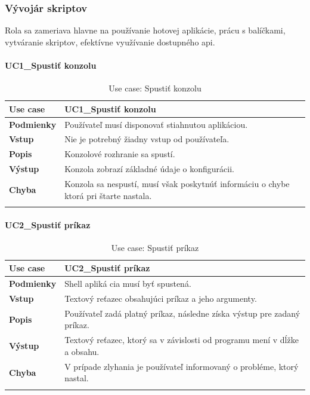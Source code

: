 {\subsubsection{Vývojár skriptov}
\indent Rola sa zameriava hlavne na používanie hotovej aplikácie, prácu s balíčkami, vytváranie skriptov, efektívne využívanie dostupného \acrshort{api}. 
\paragraph{UC1\_Spustiť konzolu}
\begin{center}
	\begin{longtable}{|p{2.5cm}|p{12.2cm}|}
		\hline
		\textbf{Use case} & UC1\_Spustiť konzolu \\ 
		\hline
		\textbf{Podmienky} & Používateľ musí disponovať stiahnutou aplikáciou.\\
		\hline
		\textbf{Vstup} & Nie je potrebný žiadny vstup od používateľa.\\
		\hline
		\textbf{Popis} & Konzolové rozhranie sa spustí. \\ 
		\hline
		\textbf{Výstup} & Konzola zobrazí základné údaje o konfigurácii.\\
		\hline
		\textbf{Chyba} & Konzola sa nespustí, musí však poskytnúť informáciu o chybe ktorá pri štarte nastala.\\
		\hline
	\caption{Use case: Spustiť konzolu}
	\label{table:1}
	\end{longtable}
\end{center}

\paragraph{UC2\_Spustiť príkaz}
\begin{center}
	\begin{longtable}{|p{2.5cm}|p{12.2cm}|}
		\hline
		\textbf{Use case} & UC2\_Spustiť príkaz \\ 
		\hline
		\textbf{Podmienky} & Shell apliká	cia musí byť spustená. \\ 
		\hline
		\textbf{Vstup} & Textový reťazec obsahujúci príkaz a jeho argumenty.\\
		\hline
		\textbf{Popis} & Používateľ zadá platný príkaz, následne získa výstup pre zadaný príkaz. \\ 
		\hline
		\textbf{Výstup} & Textový reťazec, ktorý sa v závislosti od programu mení v dĺžke a obsahu.\\
		\hline
		\textbf{Chyba} & V prípade zlyhania je používateľ informovaný o probléme, ktorý nastal.\\
		\hline
		\caption{Use case: Spustiť príkaz}
		\label{table:1}
	\end{longtable}
	

\end{center}}
